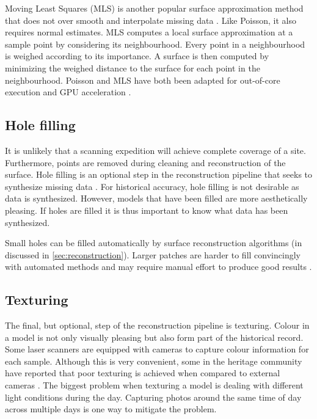 Moving Least Squares (MLS) is another popular surface approximation method that does not over smooth and interpolate missing data \cite{Alexa2003}. Like Poisson, it also requires normal estimates. MLS computes a local surface approximation at a sample point by considering its neighbourhood. Every point in a neighbourhood is weighed according to its importance. A surface is then computed by minimizing the weighed distance to the surface for each point in the neighbourhood. Poisson and MLS have both been adapted for out-of-core execution and GPU acceleration \cite{Merry2014}. \\


\subsection{Hole filling} \label{sec:filling}

It is unlikely that a scanning expedition will achieve complete coverage of a site. Furthermore, points are removed during cleaning and reconstruction of the surface. Hole filling is an optional step in the reconstruction pipeline that seeks to synthesize missing data \cite{Sharf2004} . For historical accuracy, hole filling is not desirable as data is synthesized. However, models that have been filled are more aesthetically pleasing. If holes are filled it is thus important to know what data has been synthesized.

Small holes can be filled automatically by surface reconstruction algorithms (in discussed in \ref{sec:reconstruction}). Larger patches are harder to fill convincingly with automated methods and may require manual effort to produce good results \cite{Ruther2011}.


\subsection{Texturing} \label{sec:texturing}

The final, but optional, step of the reconstruction pipeline is texturing. Colour in a model is not only visually pleasing but also form part of the historical record. Some laser scanners are equipped with cameras to capture colour information for each sample. Although this is very convenient, some in the heritage community have reported that poor texturing is achieved when compared to external cameras \cite{Ruther2011}. The biggest problem when texturing a model is dealing with different light conditions during the day. Capturing photos around the same time of day across multiple days is one way to mitigate the problem.

